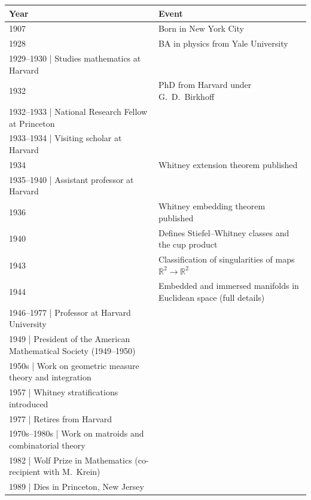 \begin{tabularx}{\linewidth}{|p{1.5cm}|>{\raggedright\arraybackslash}X|}
\hline
\textbf{Year} & \textbf{Event} \\ \hline
1907 & Born in New York City \\ \hline
1928 & BA in physics from Yale University \\ \hline
1929--1930 | Studies mathematics at Harvard \\ \hline
1932 & PhD from Harvard under G.\ D.\ Birkhoff \\ \hline
1932--1933 | National Research Fellow at Princeton \\ \hline
1933--1934 | Visiting scholar at Harvard \\ \hline
1934 & Whitney extension theorem published \\ \hline
1935--1940 | Assistant professor at Harvard \\ \hline
1936 & Whitney embedding theorem published \\ \hline
1940 & Defines Stiefel--Whitney classes and the cup product \\ \hline
1943 & Classification of singularities of maps $\mathbb{R}^2 \to \mathbb{R}^2$ \\ \hline
1944 & Embedded and immersed manifolds in Euclidean space (full details) \\ \hline
1946--1977 | Professor at Harvard University \\ \hline
1949 | President of the American Mathematical Society (1949--1950) \\ \hline
1950s | Work on geometric measure theory and integration \\ \hline
1957 | Whitney stratifications introduced \\ \hline
1977 | Retires from Harvard \\ \hline
1970s--1980s | Work on matroids and combinatorial theory \\ \hline
1982 | Wolf Prize in Mathematics (co-recipient with M.\ Krein) \\ \hline
1989 | Dies in Princeton, New Jersey \\ \hline
\end{tabularx}
